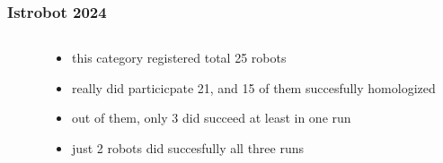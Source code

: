 \documentclass{beamer}
\begin{document}
\begin{frame}
  
  \frametitle{\bf Istrobot 2024}
  
  \begin{columns}

    \begin{column}{0.5\textwidth}
    \end{column}

    \begin{column}{0.5\textwidth}
      \begin{itemize}
        \item this category registered total 25 robots
        \item really did particicpate 21, and 15 of them succesfully homologized
        \item out of them, only 3 did succeed at least in one run
        \item just 2 robots did succesfully all three runs
      \end{itemize}
    \end{column}

  \end{columns}
  
\end{frame}
\end{document}
